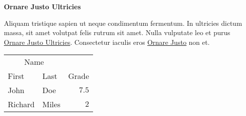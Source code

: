 \documentclass[11pt, letterpaper]{article}
\begin{document}
\begin{minipage}[t]{.30\linewidth}
\begin{mdframed}[style=sidebar,frametitle={}]
\textbf{Ornare Justo Ultricies}

Aliquam tristique sapien ut neque condimentum fermentum. In ultricies dictum massa, sit amet volutpat felis rutrum sit amet. Nulla vulputate leo et purus \href{http://www.example.com}{Ornare Justo Ultricies}. Consectetur iaculis eros \href{http://www.example.com}{Ornare Justo} non et.


\begin{tabular}{llr}
\toprule
\multicolumn{2}{c}{Name} \\
\cmidrule(r){1-2}
First & Last & Grade \\
\midrule
John & Doe & $7.5$ \\
Richard & Miles & $2$ \\
\bottomrule
\end{tabular}


\end{mdframed}
\end{minipage}\hfill %
%
%
\end{document}

